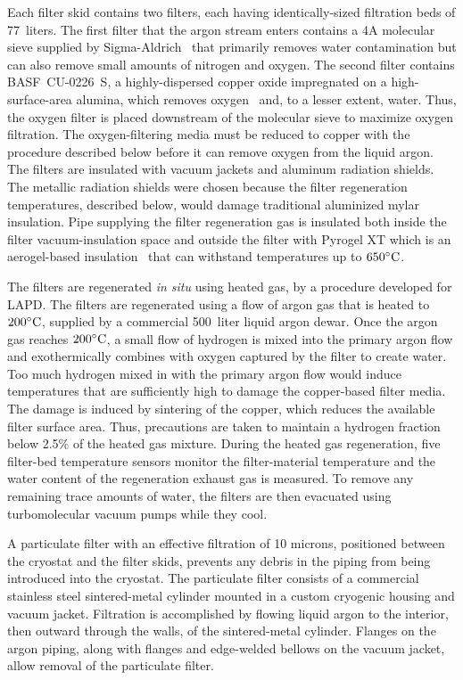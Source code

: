 Each filter skid contains two filters, each having identically-sized filtration beds of 77~liters.  The first filter that the argon stream enters contains a 4A molecular sieve supplied by Sigma-Aldrich~\cite{sigma-aldrich} that primarily removes water contamination but can also remove small amounts of nitrogen and oxygen.  The second filter contains BASF~CU-0226~S, a highly-dispersed copper oxide impregnated on a high-surface-area alumina, which removes oxygen~\cite{basf} and, to a lesser extent, water.  Thus, the oxygen filter is placed downstream of the molecular sieve to maximize oxygen filtration.  The oxygen-filtering media must be reduced to copper with the procedure described below before it can remove oxygen from the liquid argon.  The filters are insulated with vacuum jackets and aluminum radiation shields.  The metallic radiation shields were chosen because the filter regeneration temperatures, described below, would damage traditional aluminized mylar insulation.  Pipe supplying the filter regeneration gas is insulated both inside the filter vacuum-insulation space and outside the filter with Pyrogel XT which is an aerogel-based insulation~\cite{aspen-aerogels} that can withstand temperatures up to $650^{\circ}{\rm C}$. 

The filters are regenerated {\it in situ} using heated gas, by a procedure developed for LAPD.  The filters are regenerated using a flow of argon gas that is heated to $200^{\circ}{\rm C}$, supplied by a commercial 500~liter liquid argon dewar.   Once the argon gas reaches $200^{\circ}{\rm C}$, a small flow of hydrogen is mixed into the primary argon flow and exothermically combines with oxygen captured by the filter to create water.  Too much hydrogen mixed in with the primary argon flow would induce temperatures that are sufficiently high to damage the copper-based filter media.  The damage is induced by sintering of the copper, which reduces the available filter surface area.  Thus, precautions are taken to maintain a hydrogen fraction below 2.5\% of the heated gas mixture.  During the heated gas regeneration, five filter-bed temperature sensors monitor the filter-material temperature and the water content of the regeneration exhaust gas is measured.  To remove any remaining trace amounts of water, the filters are then evacuated using turbomolecular vacuum pumps while they cool. 

A particulate filter with an effective filtration of 10 microns, positioned between the cryostat and the filter skids, prevents any debris in the piping from being introduced into the cryostat.  The particulate filter consists of a commercial stainless steel sintered-metal cylinder mounted in a custom cryogenic housing and vacuum jacket.  Filtration is accomplished by flowing liquid argon to the interior, then outward through the walls, of the sintered-metal cylinder.  Flanges on the argon piping, along with flanges and edge-welded bellows on the vacuum jacket, allow removal of the particulate filter.  

